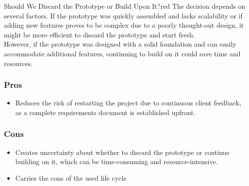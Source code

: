 \vspace{0.5cm}
\begin{prettyBox}{Should We Discard the Prototype or Build Upon It?}{red}
    The decision depends on several factors. If the prototype was quickly assembled and lacks scalability or if adding 
    new features proves to be complex due to a poorly thought-out design, it might be more efficient to discard the
    prototype and start fresh.\\

    However, if the prototype was designed with a solid foundation and can easily accommodate additional features,
    continuing to build on it could save time and resources.
\end{prettyBox}

\vspace{1.5cm}
\begin{center}
\end{center}

\vspace{1cm}
\subsubsection{Pros}
\begin{itemize}
    \item Reduces the risk of restarting the project due to continuous client feedback, as a complete requirements
document is established upfront.
\end{itemize}

\subsubsection{Cons}
\begin{itemize}
    \item Creates uncertainty about whether to discard the prototype or continue building on it, which can be time-consuming 
and resource-intensive.
    \item Carries the cons of the used life cycle
\end{itemize}

